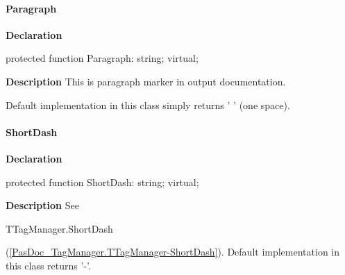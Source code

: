 \documentclass{report}
\newif\ifpdf
\begin{document}
\paragraph*{Paragraph}\hspace*{\fill}

\label{PasDoc_Gen.TDocGenerator-Paragraph}
\begin{list}{}{
\setlength{\itemindent}{0cm}
\setlength{\listparindent}{0cm}
\setlength{\leftmargin}{\evensidemargin}
\addtolength{\leftmargin}{\tmplength}
\settowidth{\labelsep}{X}
\addtolength{\leftmargin}{\labelsep}
\setlength{\labelwidth}{\tmplength}
}
\item[\textbf{Declaration}\hfill]
\ifpdf
\begin{flushleft}
\fi
\begin{ttfamily}
protected function Paragraph: string; virtual;\end{ttfamily}

\ifpdf
\end{flushleft}
\fi

\par
\item[\textbf{Description}]
This is paragraph marker in output documentation.

Default implementation in this class simply returns ' ' (one space).

\end{list}
\paragraph*{ShortDash}\hspace*{\fill}

\label{PasDoc_Gen.TDocGenerator-ShortDash}
\begin{list}{}{
\setlength{\itemindent}{0cm}
\setlength{\listparindent}{0cm}
\setlength{\leftmargin}{\evensidemargin}
\addtolength{\leftmargin}{\tmplength}
\settowidth{\labelsep}{X}
\addtolength{\leftmargin}{\labelsep}
\setlength{\labelwidth}{\tmplength}
}
\item[\textbf{Declaration}\hfill]
\ifpdf
\begin{flushleft}
\fi
\begin{ttfamily}
protected function ShortDash: string; virtual;\end{ttfamily}

\ifpdf
\end{flushleft}
\fi

\par
\item[\textbf{Description}]
See \begin{ttfamily}TTagManager.ShortDash\end{ttfamily}(\ref{PasDoc_TagManager.TTagManager-ShortDash}). Default implementation in this class returns '{-}'.

\end{list}
\end{document}
